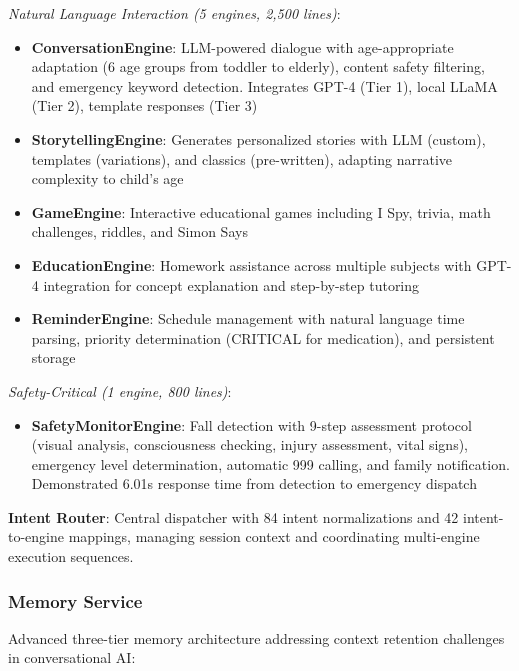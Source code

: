 \documentclass[conference]{IEEEtran}
\begin{document}
\textit{Natural Language Interaction (5 engines, 2,500 lines)}:
\begin{itemize}
    \item \textbf{ConversationEngine}: LLM-powered dialogue with age-appropriate adaptation (6 age groups from toddler to elderly), content safety filtering, and emergency keyword detection. Integrates GPT-4 (Tier 1), local LLaMA (Tier 2), template responses (Tier 3)
    \item \textbf{StorytellingEngine}: Generates personalized stories with LLM (custom), templates (variations), and classics (pre-written), adapting narrative complexity to child's age
    \item \textbf{GameEngine}: Interactive educational games including I Spy, trivia, math challenges, riddles, and Simon Says
    \item \textbf{EducationEngine}: Homework assistance across multiple subjects with GPT-4 integration for concept explanation and step-by-step tutoring
    \item \textbf{ReminderEngine}: Schedule management with natural language time parsing, priority determination (CRITICAL for medication), and persistent storage
\end{itemize}

\textit{Safety-Critical (1 engine, 800 lines)}:
\begin{itemize}
    \item \textbf{SafetyMonitorEngine}: Fall detection with 9-step assessment protocol (visual analysis, consciousness checking, injury assessment, vital signs), emergency level determination, automatic 999 calling, and family notification. Demonstrated 6.01s response time from detection to emergency dispatch
\end{itemize}

\textbf{Intent Router}: Central dispatcher with 84 intent normalizations and 42 intent-to-engine mappings, managing session context and coordinating multi-engine execution sequences.

\subsubsection{Memory Service}

Advanced three-tier memory architecture addressing context retention challenges in conversational AI:
\end{document}
